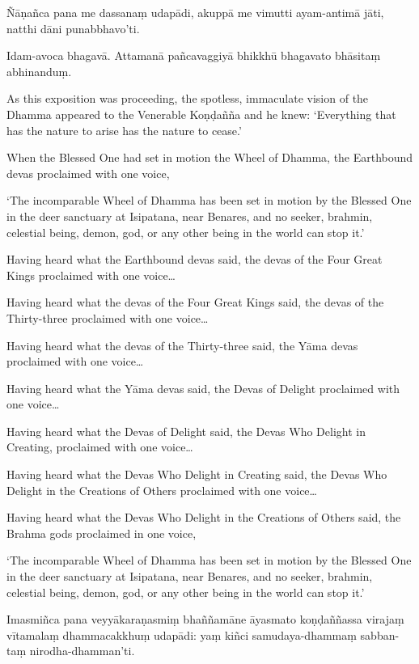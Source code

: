 Ñāṇañca pana me dassanaṃ udapādi, akuppā me vimutti ayam-antimā jāti,
natthi dāni punabbhavo'ti.

Idam-avoca bhagavā. Attamanā pañcavaggiyā bhikkhū bhagavato bhāsitaṃ
abhinanduṃ.

\clearpage

\englishText
\markboth{\englishTitle}{\rightmark}

As this exposition was proceeding, the spotless, immaculate vision of
the Dhamma appeared to the Venerable Koṇḍañña and he knew: ‘Everything
that has the nature to arise has the nature to cease.’

When the Blessed One had set in motion the Wheel of Dhamma, the
Earthbound devas proclaimed with one voice,

‘The incomparable Wheel of Dhamma has been set in motion by the Blessed
One in the deer sanctuary at Isipatana, near Benares, and no seeker,
brahmin, celestial being, demon, god, or any other being in the world
can stop it.’

Having heard what the Earthbound devas said, the devas of the Four Great
Kings proclaimed with one voice\ldots

Having heard what the devas of the Four Great Kings said, the devas of
the Thirty-three proclaimed with one voice\ldots

Having heard what the devas of the Thirty-three said, the Yāma devas
proclaimed with one voice\ldots

Having heard what the Yāma devas said, the Devas of Delight proclaimed
with one voice\ldots

Having heard what the Devas of Delight said, the Devas Who Delight in
Creating, proclaimed with one voice\ldots

Having heard what the Devas Who Delight in Creating said, the Devas Who
Delight in the Creations of Others proclaimed with one voice\ldots

Having heard what the Devas Who Delight in the Creations of Others said,
the Brahma gods proclaimed in one voice,

‘The incomparable Wheel of Dhamma has been set in motion by the Blessed
One in the deer sanctuary at Isipatana, near Benares, and no seeker,
brahmin, celestial being, demon, god, or any other being in the world
can stop it.’

\clearpage

\paliText
\markboth{\paliTitle}{\rightmark}

Imasmiñca pana veyyākaraṇasmiṃ bhaññamāne āyasmato koṇḍaññassa virajaṃ
vītamalaṃ dhammacakkhuṃ udapādi: yaṃ kiñci samudaya-dhammaṃ sabban-taṃ
nirodha-dhamman'ti.

